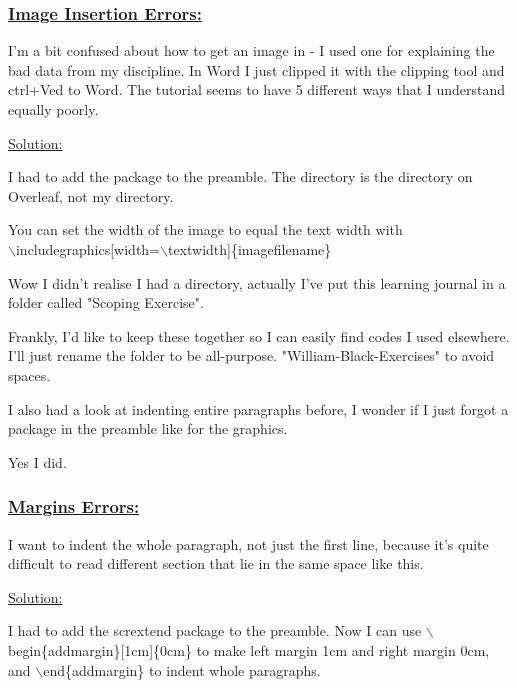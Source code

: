 \documentclass[12pt]{article}
\begin{document}
\subsubsection{\underline{Image Insertion Errors:}}\label{error:er8}
\begin{addmargin}[1cm]{0cm}
I'm a bit confused about how to get an image in - I used one for explaining the bad data from my discipline. In Word I just clipped it with the clipping tool and ctrl+Ved to Word. The tutorial seems to have 5 different ways that I understand equally poorly.

\underline{Solution:}

I had to add the package to the preamble. The directory is the directory on Overleaf, not my directory.

You can set the width of the image to equal the text width with 
\\$\backslash$includegraphics[width=$\backslash$textwidth]\{imagefilename\}
\end{addmargin}

\vspace{0.5em}
Wow I didn't realise I had a directory, actually I've put this learning journal in a folder called "Scoping Exercise".

Frankly, I'd like to keep these together so I can easily find codes I used elsewhere. I'll just rename the folder to be all-purpose. "William-Black-Exercises" to avoid spaces.

I also had a look at indenting entire paragraphs before, I wonder if I just forgot a package in the preamble like for the graphics.

Yes I did.

\subsubsection{\underline{Margins Errors:}}\label{error:er9}
\begin{addmargin}[1cm]{0cm}
I want to indent the whole paragraph, not just the first line, because it's quite difficult to read different section that lie in the same space like this.

\underline{Solution:}

I had to add the scrextend package to the preamble. Now I can use $\backslash$begin\{addmargin\}[1cm]\{0cm\} to make left margin 1cm and right margin 0cm, and $\backslash$end\{addmargin\} to indent whole paragraphs.

\end{addmargin}
\end{document}
